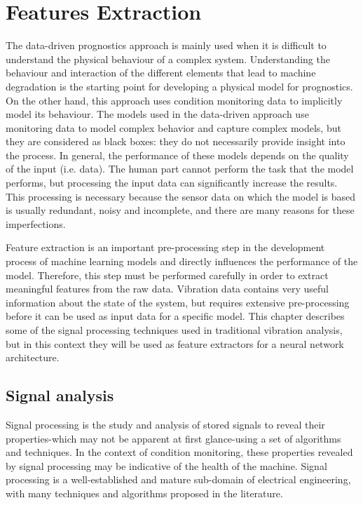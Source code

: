 \section{Features Extraction}
The data-driven prognostics approach is mainly used when it is difficult to understand the physical behaviour of a complex system. Understanding the behaviour and interaction of the different elements that lead to machine degradation is the starting point for developing a physical model for prognostics.
On the other hand, this approach uses condition monitoring data to implicitly model its behaviour. The models used in the data-driven approach use monitoring data to model complex behavior and capture complex models, but they are considered as black boxes: they do not necessarily provide insight into the process.
In general, the performance of these models depends on the quality of the input (i.e. data). The human part cannot perform the task that the model performs, but processing the input data can significantly increase the results. This processing is necessary because the sensor data on which the model is based is usually redundant, noisy and incomplete, and there are many reasons for these imperfections.

Feature extraction is an important pre-processing step in the development process of machine learning models and directly influences the performance of the model. Therefore, this step must be performed carefully in order to extract meaningful features from the raw data. Vibration data contains very useful information about the state of the system, but requires extensive pre-processing before it can be used as input data for a specific model. This chapter describes some of the signal processing techniques used in traditional vibration analysis, but in this context they will be used as feature extractors for a neural network architecture.

\subsection{Signal analysis}
Signal processing is the study and analysis of stored signals to reveal their properties-which may not be apparent at first glance-using a set of algorithms and techniques. In the context of condition monitoring, these properties revealed by signal processing may be indicative of the health of the machine.
Signal processing is a well-established and mature sub-domain of electrical engineering, with many techniques and algorithms proposed in the literature.


